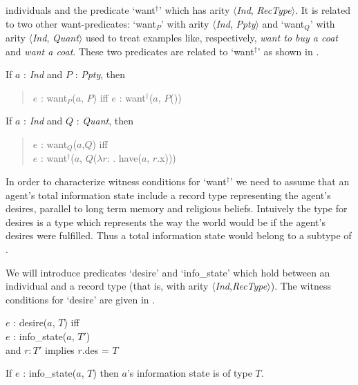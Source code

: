 individuals and the predicate `want$^\dagger$' which has arity
$\langle$\textit{Ind}, \textit{RecType}$\rangle$.  It is related to
two other want-predicates: `want$_P$' with arity
$\langle$\textit{Ind}, \textit{Ppty}$\rangle$ and `want$_Q$' with
arity $\langle$\textit{Ind}, \textit{Quant}$\rangle$ used to treat
examples like,
respectively, \textit{want to buy a coat} and \textit{want a coat}.
These two predicates are related to `want$^\dagger$' as shown in
\nexteg{}.
\begin{ex} 
\begin{subex} 
 
\item If $a$ : \textit{Ind} and $P$ : \textit{Ppty}, then 
\begin{quote}
$e$ : want$_P$($a$, $P$) iff $e$ : want$^\dagger$($a$, $P$())
\end{quote} 
 
\item If $a$ : \textit{Ind} and $Q$ : \textit{Quant}, then 
\begin{quote}
$e$ : want$_Q$($a$,$Q$) iff \\
\hspace*{2em}$e$ : want$^\dagger$($a$, $Q$($\lambda
r$: . have($a$, $r$.x)))
\end{quote} 
\end{subex} 
\label{ex:want-witcond} 
   
\end{ex} 

In order to characterize witness conditions for `want$^{\dagger}$' we
need to assume that an agent's total information state include a
record type representing the agent's desires, parallel to long term
memory and religious beliefs.  Intuively the type for desires is a
type which represents the way the world would be if the agent's
desires were fulfilled.  Thus a total information state would belong
to a subtype of \nexteg{}.
\begin{ex} 
\end{ex} 
We will introduce predicates `desire' and `info\_state' which hold between an
individual and a record type (that is, with arity
$\langle$\textit{Ind},\textit{RecType}$\rangle$).  The witness
conditions for `desire' are given in \nexteg{}.
\begin{ex} 
$e$ : desire($a$, $T$) iff\\
\hspace*{2em} $e$ : info\_state($a$, $T'$) \\
\hspace*{2em} and $r:T'$ implies $r$.des = $T$
\end{ex} 
If $e$ : info\_state($a$, $T$) then $a$'s information state is of type
$T$. 

